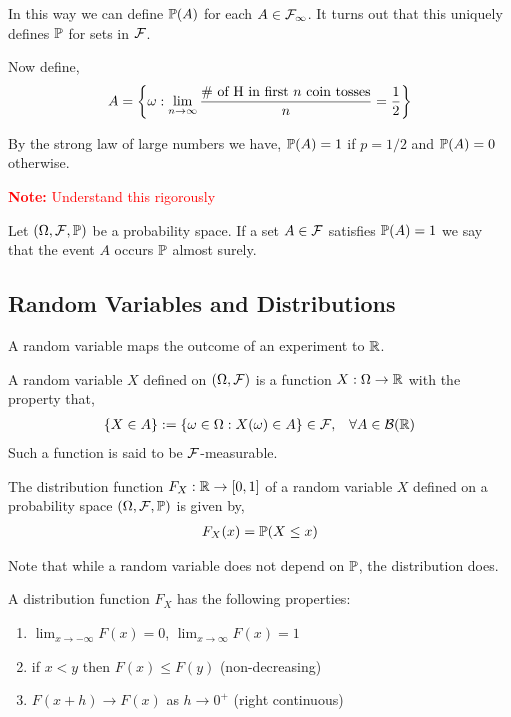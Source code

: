 \documentclass[12pt]{article}
\newcommand{\note}[1]{\textcolor{red}{\textbf{Note:} #1}}
\begin{document}
In this way we can define \( \mathbb{P}(A) \) for each \( A\in\mathcal{F}_\infty \). It turns out that this uniquely defines \( \mathbb{P} \) for sets in \( \mathcal{F} \).

Now define,
\begin{align*}
    A = \left\{ \omega : \lim_{n\to\infty} \dfrac{\text{\# of H in first \( n \) coin tosses}}{n} = \dfrac{1}{2} \right\}
\end{align*}

By the strong law of large numbers we have, \( \mathbb{P}(A) = 1 \) if \( p=1/2 \) and \( \mathbb{P}(A) = 0 \) otherwise.

\note{Understand this rigorously}

\begin{definition}
Let \( (\Omega,\mathcal{F},\mathbb{P}) \) be a probability space. If a set \( A\in\mathcal{F} \) satisfies \( \mathbb{P}(A) = 1 \) we say that the event \( A \) occurs \( \mathbb{P} \) almost surely.
\end{definition}

\subsection{Random Variables and Distributions}
A random variable maps the outcome of an experiment to \( \mathbb{R} \).

\begin{definition}
A random variable \( X \) defined on \( (\Omega, \mathcal{F}) \) is a function \( X: \Omega \to \mathbb{R} \) with the property that,
\begin{align*}
    \{X \in A\} := \{\omega \in \Omega : X(\omega) \in A \} \in \mathcal{F}, && \forall A\in \mathcal{B}(\mathbb{R})
\end{align*}
Such a function is said to be \( \mathcal{F} \)-measurable.
\end{definition}

\begin{definition}
The distribution function \( F_X : \mathbb{R} \to [0,1] \) of a random variable \( X \) defined on a probability space \( (\Omega, \mathcal{F}, \mathbb{P}) \) is given by,
\begin{align*}
    F_X(x) = \mathbb{P}(X\leq x)
\end{align*}
\end{definition}

Note that while a random variable does not depend on \( \mathbb{P} \), the distribution does.

\begin{lemma}
A distribution function \( F_X \) has the following properties:
\begin{enumerate}[nolistsep]
    \item \( \lim_{x\to-\infty} F(x) = 0 \), \( \lim_{x\to\infty} F(x) = 1 \)
    \item if \( x < y \) then \( F(x) \leq F(y) \) (non-decreasing)
    \item \( F(x+h) \to F(x) \) as \( h\to 0^+ \) (right continuous)
\end{enumerate}
\end{lemma}
\end{document}
